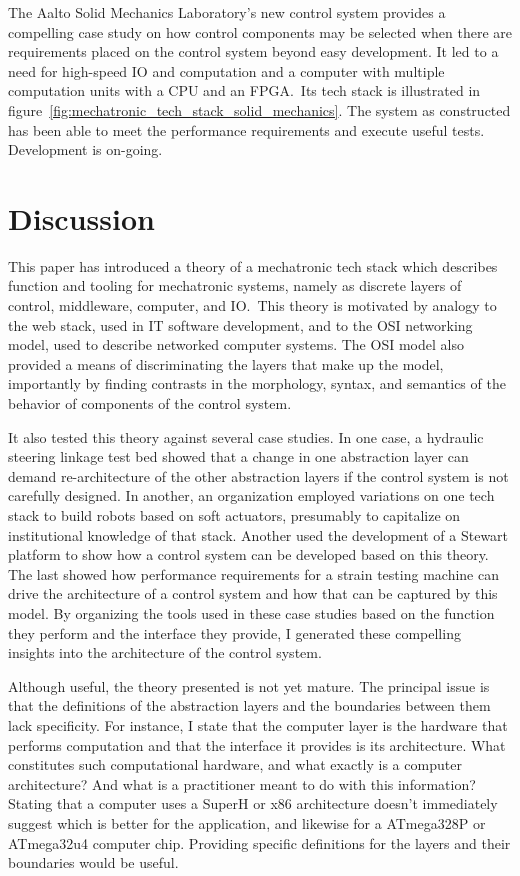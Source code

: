 \documentclass[english,12pt,a4paper,pdftex,eng,utf8]{aaltothesis}
\begin{document}
The Aalto Solid Mechanics Laboratory's new control system provides a compelling case study on how control components may be selected when there are requirements placed on the control system beyond easy development.  It led to a need for high-speed IO and computation and a computer with multiple computation units with a CPU and an FPGA.\  Its tech stack is illustrated in figure~\ref{fig:mechatronic_tech_stack_solid_mechanics}.  The system as constructed has been able to meet the performance requirements and execute useful tests.  Development is on-going.

\clearpage


\section{Discussion}

This paper has introduced a theory of a mechatronic tech stack which describes function and tooling for mechatronic systems, namely as discrete layers of control, middleware, computer, and IO.\  This theory is motivated by analogy to the web stack, used in IT software development, and to the OSI networking model, used to describe networked computer systems.  The OSI model also provided a means of discriminating the layers that make up the model, importantly by finding contrasts in the morphology, syntax, and semantics of the behavior of components of the control system.

It also tested this theory against several case studies.  In one case, a hydraulic steering linkage test bed showed that a change in one abstraction layer can demand re-architecture of the other abstraction layers if the control system is not carefully designed.  In another, an organization employed variations on one tech stack to build robots based on soft actuators, presumably to capitalize on institutional knowledge of that stack.  Another used the development of a Stewart platform to show how a control system can be developed based on this theory.  The last showed how performance requirements for a strain testing machine can drive the architecture of a control system and how that can be captured by this model.  By organizing the tools used in these case studies based on the function they perform and the interface they provide, I generated these compelling insights into the architecture of the control system.

Although useful, the theory presented is not yet mature.  The principal issue is that the definitions of the abstraction layers and the boundaries between them lack specificity.  For instance, I state that the computer layer is the hardware that performs computation and that the interface it provides is its architecture.  What constitutes such computational hardware, and what exactly is a computer architecture?  And what is a practitioner meant to do with this information?  Stating that a computer uses a SuperH or x86 architecture doesn't immediately suggest which is better for the application, and likewise for a ATmega328P or ATmega32u4 computer chip.  Providing specific definitions for the layers and their boundaries would be useful.
\end{document}
